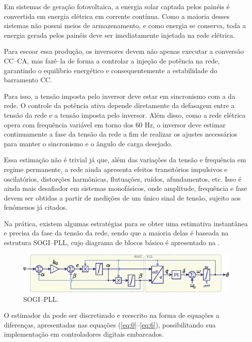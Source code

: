 Em sistemas de geração fotovoltaica, a energia solar captada pelos painéis é convertida em energia elétrica em corrente contínua.
Como a maioria desses sistemas não possui meios de armazenamento, e como energia se conserva, toda a energia gerada
pelos painéis deve ser imediatamente injetada na rede elétrica.

Para escoar essa produção, os inversores devem não apenas executar a conversão CC--CA, mas fazê--la de forma
a controlar a injeção de potência na rede, garantindo o equilíbrio energético e consequentemente a estabilidade do
barramento CC.

Para isso, a tensão imposta pelo inversor deve estar em sincronismo com a da rede.
O controle da potência ativa depende diretamente da defasagem entre a tensão da rede e a tensão imposta pelo inversor.
Além disso, como a rede elétrica opera com frequência variável em torno dos 60 Hz, o inversor deve estimar
continuamente a fase da tensão da rede a fim de realizar os ajustes necessários para manter o sincronismo e o
ângulo de carga desejado.

Essa estimação não é trivial já que, além das variações da tensão e frequência em regime permanente, a rede ainda
apresenta efeitos transitórios impulsivos e oscilatórios, distorções harmônicas, flutuações, ruídos, afundamentos, etc.
Isso é ainda mais desafiador em sistemas monofásicos, onde amplitude, frequência e fase devem ser obtidas a partir de
medições de um único sinal de tensão, sujeito aos fenômenos já citados.

Na prática, existem algumas estratégias para se obter uma estimativa instantânea e precisa da fase da tensão da rede,
sendo que a maioria delas é baseada na estrutura SOGI--PLL, cujo diagrama de blocos básico é apresentado na .
\begin{figure}[htbp]
    \centering
    \includegraphics{figs/pll.eps}
    \caption{SOGI--PLL.}
    \label{fig:ex01}
\end{figure}



O estimador da  pode ser discretizado e reescrito na forma de equações a diferenças, apresentadas nas equações
(\ref{eq:0}--\ref{eq:6}), possibilitando sua implementação em controladores digitais embarcados.

